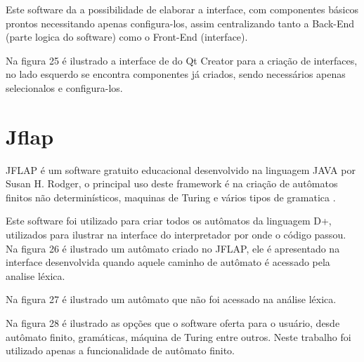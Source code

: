 \documentclass[12pt,oneside,a4paper,chapter=TITLE,section=TITLE,sumario=tradicional]{abntex2}
\begin{document}
Este software da a possibilidade de elaborar a interface, com componentes básicos prontos necessitando apenas configura-los, assim centralizando tanto a Back-End (parte logica do software) como o Front-End (interface). 

Na figura 25 é ilustrado a interface de do Qt Creator para a criação de interfaces, no lado esquerdo se encontra componentes já criados, sendo necessários apenas selecionalos e configura-los.

\begin{figure}[htb]
\end{figure} 

\section{Jflap}
\label{sec:jflap}

JFLAP é um software gratuito educacional desenvolvido na linguagem JAVA por Susan H. Rodger, o principal uso deste framework é na criação de autômatos finitos não determinísticos, maquinas de Turing e vários tipos de gramatica \cite{susan2005}.

Este software foi utilizado para criar todos os autômatos da linguagem D+, utilizados para ilustrar na interface do interpretador por onde o código passou. Na figura 26 é ilustrado um autômato criado no JFLAP, ele é apresentado na interface desenvolvida quando aquele caminho de autômato é acessado pela analise léxica.

\begin{figure}[htb]
\end{figure} 

Na figura 27 é ilustrado um autômato que não foi acessado na análise léxica.

\begin{figure}[H]
\end{figure} 

Na figura 28 é ilustrado as opções que o software oferta para o usuário, desde autômato finito, gramáticas, máquina de Turing entre outros. Neste trabalho foi utilizado apenas a funcionalidade de autômato finito.

\begin{figure}[htb]
\end{figure} 
\end{document}

